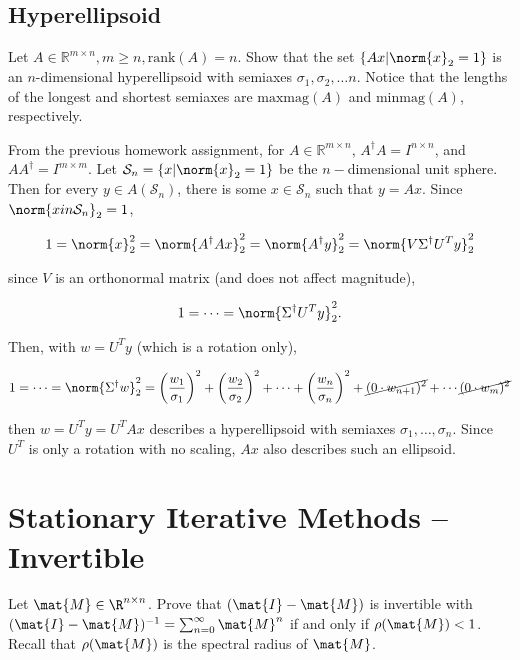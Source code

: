 \documentclass{template}
\begin{document}
\subsection{Hyperellipsoid}

Let $A \in \mathbb{R}^{m \times n}, m\geq n, \text{rank}(A)=n.$ Show that the set $\left\{  Ax | \norm{x}_2 = 1 \right\}$ is an $n$-dimensional hyperellipsoid with semiaxes $\sigma_1, \sigma_2, \dots n.$ Notice that the lengths of the longest and shortest semiaxes are $\text{maxmag}(A)$ and $\text{minmag}(A)$, respectively.

From the previous homework assignment, for $A \in \mathbb{R}^{m \times n}$, $A^\dagger A = I^{n\times n}$, and $AA^\dagger = I^{m\times m}.$ Let $\mathcal{S}_n = \left\{ x | \norm{x}_2 = 1 \right\}$ be the $n-$dimensional unit sphere. Then for every $y \in A(\mathcal{S}_n)$, there is some $x \in \mathcal{S}_n$ such that $y=Ax$. Since $\norm{xin \mathcal{S}_n}_2 = 1$, 

\begin{equation}
  1 = \norm{x}_2^2 = \norm{A^\dagger Ax}_2^2 = \norm{A^\dagger y}_2^2 = \norm{V\Sigma^\dagger U^T y}_2^2
\end{equation}

since $V$ is an orthonormal matrix (and does not affect magnitude),

\begin{equation}
  1 = \dots = \norm{\Sigma^\dagger U^T y}_2^2.
\end{equation}

Then, with $w = U^T y$ (which is a rotation only), 

\begin{equation}
  1 = \dots = \norm{\Sigma^\dagger w}_2^2 = \left( \frac{w_1}{\sigma_1}\right)^2 + \left( \frac{w_2}{\sigma_2}\right)^2 + \cdots + \left( \frac{w_n}{\sigma_n}\right)^2 + \cancel{(0\cdot w_{n+1})^2} + \cdots \cancel{(0\cdot w_{m})^2}
\end{equation}

then $w = U^T y = U^T Ax$ describes a hyperellipsoid with semiaxes $\sigma_1, \dots ,\sigma_n$. Since $U^T$ is only a rotation with no scaling, $Ax$ also describes such an ellipsoid.

\section{Stationary Iterative Methods -- Invertible}

Let $\mat{M} \in \R^{n \times n}$. Prove that 
$(\mat{I} - \mat{M})$ is invertible with $(\mat{I} - \mat{M})^{-1} = \sum_{n = 0}^\infty \mat{M}^n$ 
if and only if $\rho(\mat{M}) < 1$. Recall that $\rho(\mat{M})$ is the spectral 
radius of $\mat{M}$. 
\end{document}
